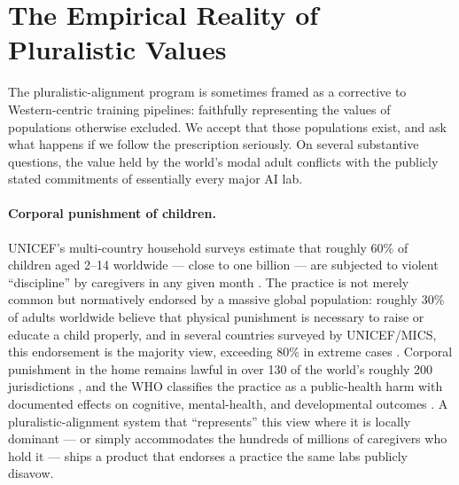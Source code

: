 \documentclass{article}
\theoremstyle{plain}
\theoremstyle{definition}
\theoremstyle{remark}
\begin{document}
\section{The Empirical Reality of Pluralistic Values}
\label{sec:empirical-reality}

The pluralistic-alignment program is sometimes framed as a corrective to Western-centric training pipelines: faithfully representing the values of populations otherwise excluded. We accept that those populations exist, and ask what happens if we follow the prescription seriously. On several substantive questions, the value held by the world's modal adult conflicts with the publicly stated commitments of essentially every major AI lab.

\paragraph{Corporal punishment of children.}
UNICEF's multi-country household surveys estimate that roughly 60\% of children aged 2--14 worldwide --- close to one billion --- are subjected to violent ``discipline'' by caregivers in any given month \citep{unicef2014hidden, unicef2017familiar}. The practice is not merely common but normatively endorsed by a massive global population: roughly 30\% of adults worldwide believe that physical punishment is necessary to raise or educate a child properly, and in several countries surveyed by UNICEF/MICS, this endorsement is the majority view, exceeding 80\% in extreme cases \citep{unicef2014hidden}. Corporal punishment in the home remains lawful in over 130 of the world's roughly 200 jurisdictions \citep{endcorporalpunishment2024}, and the WHO classifies the practice as a public-health harm with documented effects on cognitive, mental-health, and developmental outcomes \citep{who2020violence}. A pluralistic-alignment system that ``represents'' this view where it is locally dominant --- or simply accommodates the hundreds of millions of caregivers who hold it --- ships a product that endorses a practice the same labs publicly disavow.
\end{document}
